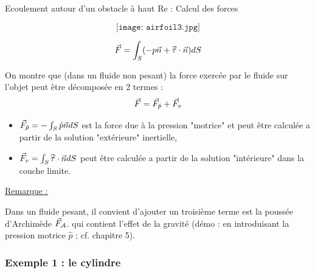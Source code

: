 \begin{frame}{Ecoulement autour d'un obstacle à haut Re : Calcul des forces} 
\small

$$
\texttt{[image: airfoil3.jpg]}
$$

$$
\vec{F} = \int_S (-p \vec{n} + \accentset{\Rightarrow}{\tau}\cdot \vec{n} ) dS
$$

On montre que (dans un fluide non pesant) la force exercée par le fluide sur l'objet peut être décomposée en 2 termes :
$$
\vec{F} = \vec{F}_{\hat{p}} + \vec{F}_{v}
$$


\begin{itemize}
\item $\vec{F}_{\hat{p}} = - \int_S \hat{p} \vec{n} dS $ est la force due à la pression 
"motrice" et peut être calculée a partir de la solution "extérieure" inertielle,
 

\item $ \vec{F}_{v} = \int_S \accentset{\Rightarrow}{\tau}\cdot \vec{n}  dS$ peut être calculée a partir de la solution "intérieure" dans la couche limite.

\end{itemize}

\underline{Remarque :} 

Dans un fluide pesant, il convient d'ajouter un troisième terme 
 est la poussée d'Archimède $ \vec{F}_{\cal A}$.  qui contient l'effet de la gravité
(démo : en introduisant la pression motrice $\hat p$ ; cf. chapitre 5).



\end{frame}






\subsubsection{Exemple 1 : le cylindre}

